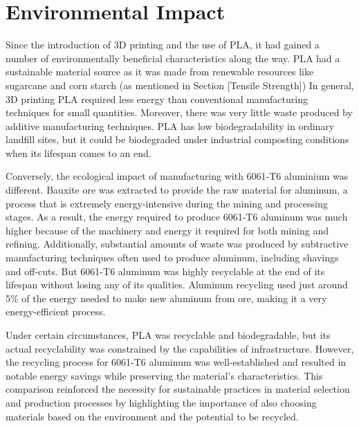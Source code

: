 \section{Environmental Impact}

    Since the introduction of 3D printing and the use of PLA, it had gained a number of environmentally
    beneficial characteristics along the way. PLA had a sustainable material source as it was made from
    renewable resources like sugarcane and corn starch (as mentioned in Section [Tensile Strength]) In
    general, 3D printing PLA required less energy than conventional manufacturing techniques for small
    quantities. Moreover, there was very little waste produced by additive manufacturing techniques. PLA has
    low biodegradability in ordinary landfill sites, but it could be biodegraded under industrial composting
    conditions when its lifespan comes to an end.

    Conversely, the ecological impact of manufacturing with 6061-T6 aluminium was different. Bauxite ore
    was extracted to provide the raw material for aluminum, a process that is extremely energy-intensive
    during the mining and processing stages. As a result, the energy required to produce 6061-T6 aluminum
    was much higher because of the machinery and energy it required for both mining and refining.
    Additionally, substantial amounts of waste was produced by subtractive manufacturing techniques often
    used to produce aluminum, including shavings and off-cuts. But 6061-T6 aluminum was highly
    recyclable at the end of its lifespan without losing any of its qualities. Aluminum recycling used just
    around 5\% of the energy needed to make new aluminum from ore, making it a very energy-efficient
    process.

    Under certain circumstances, PLA was recyclable and biodegradable, but its actual recyclability was
    constrained by the capabilities of infrastructure. However, the recycling process for 6061-T6 aluminum
    was well-established and resulted in notable energy savings while preserving the material's
    characteristics. This comparison reinforced the necessity for sustainable practices in material selection
    and production processes by highlighting the importance of also choosing materials based on the
    environment and the potential to be recycled.